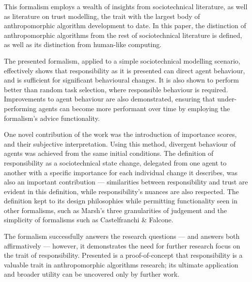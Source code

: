 This formalism employs a wealth of insights from sociotechnical literature, as well as literature on trust modelling, the trait with the largest body of anthropomorphic algorithm development to date. In this paper, the distinction of anthropomorphic algorithms from the rest of sociotechnical literature is defined, as well as its distinction from  human-like computing.\par

The presented formalism, applied to a simple sociotechnical modelling scenario, effectively shows that responsibility as it is presented can direct agent behaviour, and is sufficient for significant behavioural changes. It is also shown to perform better than random task selection, where responsible behaviour is required. Improvements to agent behaviour are also demonstrated, ensuring that under-performing agents can become more performant over time by employing the formalism's advice functionality.\par

One novel contribution of the work was the introduction of importance scores, and their subjective interpretation. Using this method, divergent behaviour of agents was achieved from the same initial conditions. The definition of responsibility as a sociotechnical state change, delegated from one agent to another with a specific importance for each individual change it describes, was also an important contribution --- similarities between responsibility and trust are evident in this definition, while responsibility's nuances are also respected. The definition kept to its design philosophies while permitting functionality seen in other formalisms, such as Marsh's three granularities of judgement and the simplicity of formalisms such as Castelfranchi \& Falcone.\par

The formalism successfully answers the research questions --- and answers both affirmatively --- however, it demonstrates the need for further research focus on the trait of responsibility. Presented is a proof-of-concept that responsibility is a valuable trait in anthropomorphic algorithms research; its ultimate application and broader utility can be uncovered only by further work.




